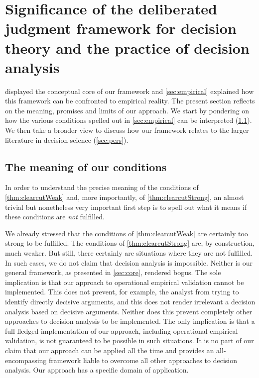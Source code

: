 \documentclass[smallextended,nospthms, natbib]{svjour3}
\begin{document}
\section{Significance of the deliberated judgment framework for decision theory and the practice of decision analysis}
\label{sec:discussion}
 displayed the conceptual core of our framework and \cref{sec:empirical} explained how this framework can be confronted to empirical reality. The present section reflects on the meaning, promises and limits of our approach. We start by pondering on how the various conditions spelled out in \cref{sec:empirical} can be interpreted (\cref{sec:meaning}). We then take a broader view to discuss how our framework relates to the larger literature in decision science (\cref{sec:pers}).

\subsection{The meaning of our conditions}
\label{sec:meaning}
In order to understand the precise meaning of the conditions of \cref{thm:clearcutWeak} and, more importantly, of \cref{thm:clearcutStrong}, an almost trivial but nonetheless very important first step is to spell out what it means if these conditions are \emph{not} fulfilled.

We already stressed that the conditions of \cref{thm:clearcutWeak} are certainly too strong to be fulfilled. The conditions of \cref{thm:clearcutStrong} are, by construction, much weaker. But still, there certainly are situations where they are not fulfilled. In such cases, we do not claim that decision analysis is impossible. Neither is our general framework, as presented in \cref{sec:core}, rendered bogus. The sole implication is that our approach to operational empirical validation cannot be implemented. This does not prevent, for example, the analyst from trying to identify directly decisive arguments, and this does not render irrelevant a decision analysis based on decisive arguments. Neither does this prevent completely other approaches to decision analysis to be implemented. The only implication is that a full-fledged implementation of our approach, including operational empirical validation, is not guaranteed to be possible in such situations. It is no part of our claim that our approach can be applied all the time and provides an all-encompassing framework liable to overcome all other approaches to decision analysis. Our approach has a specific domain of application.
\end{document}
